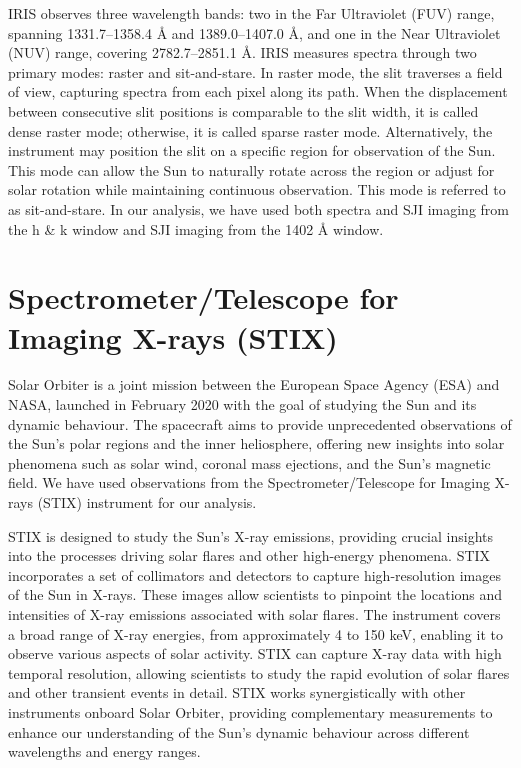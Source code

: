 IRIS observes three wavelength bands: two in the Far Ultraviolet (FUV) range, spanning 1331.7–1358.4 {\AA} and 1389.0–1407.0 {\AA}, and one in the Near Ultraviolet (NUV) range, covering 2782.7–2851.1 {\AA}. IRIS measures spectra through two primary modes: raster and sit-and-stare. In raster mode, the slit traverses a field of view, capturing spectra from each pixel along its path. When the displacement between consecutive slit positions is comparable to the slit width, it is called dense raster mode; otherwise, it is called sparse raster mode. Alternatively, the instrument may position the slit on a specific region for observation of the Sun. This mode can allow the Sun to naturally rotate across the region or adjust for solar rotation while maintaining continuous observation. This mode is referred to as sit-and-stare. In our analysis, we have used both spectra and SJI imaging from the  h \& k window and SJI imaging from the  1402 {\AA} window.

\section{Spectrometer/Telescope for Imaging X-rays (STIX)}

Solar Orbiter \citep[SO;][]{so} is a joint mission between the European Space Agency (ESA) and NASA, launched in February 2020 with the goal of studying the Sun and its dynamic behaviour. The spacecraft aims to provide unprecedented observations of the Sun's polar regions and the inner heliosphere, offering new insights into solar phenomena such as solar wind, coronal mass ejections, and the Sun's magnetic field. We have used observations from the Spectrometer/Telescope for Imaging X-rays (STIX) instrument for our analysis.

 STIX \citep{stix,stix1} is designed to study the Sun's X-ray emissions, providing crucial insights into the processes driving solar flares and other high-energy phenomena. STIX incorporates a set of collimators and detectors to capture high-resolution images of the Sun in X-rays. These images allow scientists to pinpoint the locations and intensities of X-ray emissions associated with solar flares. The instrument covers a broad range of X-ray energies, from approximately 4 to 150 keV, enabling it to observe various aspects of solar activity. STIX can capture X-ray data with high temporal resolution, allowing scientists to study the rapid evolution of solar flares and other transient events in detail. STIX works synergistically with other instruments onboard Solar Orbiter, providing complementary measurements to enhance our understanding of the Sun's dynamic behaviour across different wavelengths and energy ranges.


